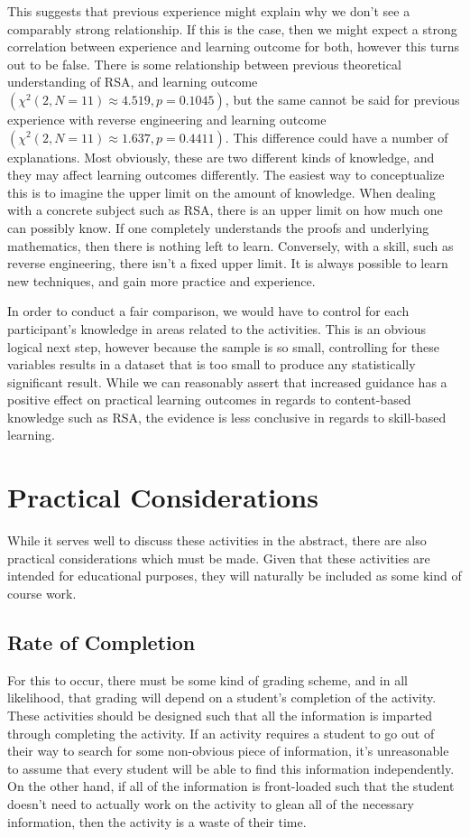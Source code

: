         This suggests that previous experience might explain why we don't see a comparably strong relationship. %
If this is the case, then we might expect a strong correlation between experience and learning outcome for both, however this turns out to be false. %
There is some relationship between previous theoretical understanding of RSA, and learning outcome $(\chi^2(2, N=11)\approx4.519,  p = 0.1045)$, but the same cannot be said for previous experience with reverse engineering and learning outcome $(\chi^2(2, N=11)\approx1.637,  p = 0.4411)$. %
This difference could have a number of explanations. %
Most obviously, these are two different kinds of knowledge, and they may affect learning outcomes differently. %
The easiest way to conceptualize this is to imagine the upper limit on the amount of knowledge. %
When dealing with a concrete subject such as RSA, there is an upper limit on how much one can possibly know. %
If one completely understands the proofs and underlying mathematics, then there is nothing left to learn. %
Conversely, with a skill, such as reverse engineering, there isn't a fixed upper limit. %
It is always possible to learn new techniques, and gain more practice and experience. 

        In order to conduct a fair comparison, we would have to control for each participant's knowledge in areas related to the activities. %
This is an obvious logical next step, however because the sample is so small, controlling for these variables results in a dataset that is too small to produce any statistically significant result. %
While we can reasonably assert that increased guidance has a positive effect on practical learning outcomes in regards to content-based knowledge such as RSA, the evidence is less conclusive in regards to skill-based learning. 

\section{Practical Considerations}
    While it serves well to discuss these activities in the abstract, there are also practical considerations which must be made. %
Given that these activities are intended for educational purposes, they will naturally be included as some kind of course work.

    \subsection{Rate of Completion}
         For this to occur, there must be some kind of grading scheme, and in all likelihood, that grading will depend on a student's completion of the activity. %
These activities should be designed such that all the information is imparted through completing the activity. %
If an activity requires a student to go out of their way to search for some non-obvious piece of information, it's unreasonable to assume that every student will be able to find this information independently. %
On the other hand, if all of the information is front-loaded such that the student doesn't need to actually work on the activity to glean all of the necessary information, then the activity is a waste of their time. 

